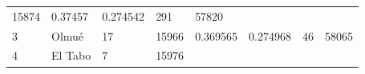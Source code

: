 \documentclass[]{article}
\begin{document}
\begin{longtable}[]{@{}llllllll@{}}
\begin{minipage}[t]{0.13\columnwidth}
15874\strut
\end{minipage} & \begin{minipage}[t]{0.10\columnwidth}\raggedright
0.37457\strut
\end{minipage} & \begin{minipage}[t]{0.09\columnwidth}\raggedright
0.274542\strut
\end{minipage} & \begin{minipage}[t]{0.11\columnwidth}\raggedright
291\strut
\end{minipage} & \begin{minipage}[t]{0.10\columnwidth}\raggedright
57820\strut
\end{minipage}\tabularnewline
\begin{minipage}[t]{0.03\columnwidth}\raggedright
3\strut
\end{minipage} & \begin{minipage}[t]{0.09\columnwidth}\raggedright
Olmué\strut
\end{minipage} & \begin{minipage}[t]{0.14\columnwidth}\raggedright
17\strut
\end{minipage} & \begin{minipage}[t]{0.13\columnwidth}\raggedright
15966\strut
\end{minipage} & \begin{minipage}[t]{0.10\columnwidth}\raggedright
0.369565\strut
\end{minipage} & \begin{minipage}[t]{0.09\columnwidth}\raggedright
0.274968\strut
\end{minipage} & \begin{minipage}[t]{0.11\columnwidth}\raggedright
46\strut
\end{minipage} & \begin{minipage}[t]{0.10\columnwidth}\raggedright
58065\strut
\end{minipage}\tabularnewline
\begin{minipage}[t]{0.03\columnwidth}\raggedright
4\strut
\end{minipage} & \begin{minipage}[t]{0.09\columnwidth}\raggedright
El Tabo\strut
\end{minipage} & \begin{minipage}[t]{0.14\columnwidth}\raggedright
7\strut
\end{minipage} & \begin{minipage}[t]{0.13\columnwidth}\raggedright
15976\strut
\end{minipage} & \begin{minipage}[t]{0.10\columnwidth}\raggedright

\end{minipage}
\end{longtable}
\end{document}
